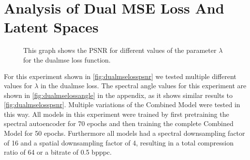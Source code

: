 \section{Analysis of Dual MSE Loss And Latent Spaces \label{sec:ch5dualmse}}
\begin{figure}
	\centering
	\datatable
	\caption{This graph shows the PSNR for different values of the parameter $\lambda$ for the \ac{dualmse} loss function.}
	\label{fig:dualmselosspsnr}
	\end{figure}
For this experiment shown in \autoref{fig:dualmselosspsnr} we tested multiple different values for $\lambda$ in the \ac{dualmse} loss. The spectral angle values for this experiment are shown in \autoref{fig:dualmselossangle} in the appendix, as it shows similar results to \autoref{fig:dualmselosspsnr}. Multiple variations of the Combined Model were tested in this way. All models in this experiment were trained by first pretraining the spectral autoencoder for 70 epochs and then training the complete Combined Model for 50 epochs. Furthermore all models had a spectral downsampling factor of 16 and a spatial downsampling factor of 4, resulting in a total compression ratio of 64 or a bitrate of 0.5 \ac{bpppc}.


